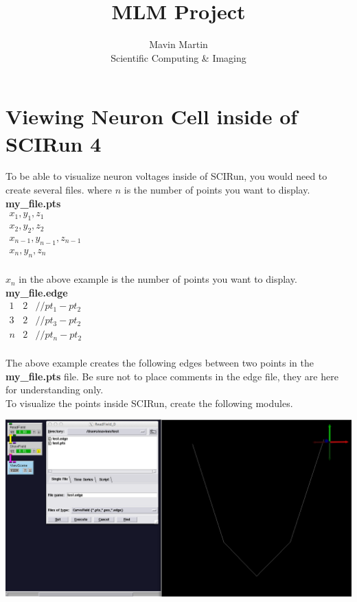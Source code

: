 \documentclass{article}
\title{MLM Project}
\author{Mavin Martin\\
Scientific Computing \& Imaging}
\begin{document}
\maketitle
\section{Viewing Neuron Cell inside of SCIRun 4}
\label{viewing_neuron_cell}
To be able to visualize neuron voltages inside of SCIRun, you would need to create several files. where $n$ is the number of points you want to display.\\

\textbf{my\_file.pts}\\
\begin{math}
	\begin{array}{l}
	x_1,y_1,z_1\\
	x_2,y_2,z_2\\
	x_{n-1},y_{n-1},z_{n-1}\\
	x_n,y_n,z_n
	\end{array}
\end{math}\\\\


$x_n$ in the above example is the number of points you want to display.\\

\textbf{my\_file.edge}\\
\begin{math}
	\begin{array}{lll}
	1 & 2 & //pt_1-pt_2\\
	3 & 2 & //pt_3-pt_2\\
	n & 2 & //pt_n-pt_2
	\end{array}
\end{math}\\\\

The above example creates the following edges between two points in the \textbf{my\_file.pts} file.  Be sure not to place comments in the edge file, they are here for understanding only.\\

To visualize the points inside SCIRun, create the following modules.

\includegraphics[width=\textwidth]{images/pt_edge_example.png}\\
\end{document}
